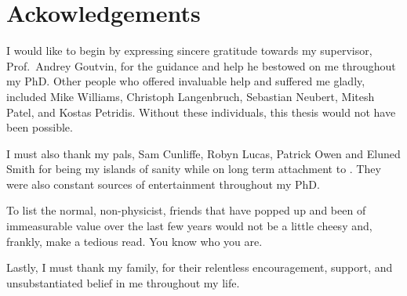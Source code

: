 \clearpage
\chapter*{\centering Ackowledgements}
\begin{center}
  {\setlength{\currentparskip}{\parskip}%
  \begin{minipage}{\abstractpagewidth}
    \setlength{\parskip}{\currentparskip}%
    I would like to begin by expressing sincere gratitude towards my supervisor, Prof.~Andrey
    Goutvin, for the guidance and help he bestowed on me throughout my PhD.
    Other people who offered invaluable help and suffered me gladly, included
    Mike Williams, Christoph Langenbruch, Sebastian Neubert, Mitesh Patel, and
    Kostas Petridis.
    Without these individuals, this thesis would not have been possible.

    I must also thank my pals, Sam Cunliffe, Robyn Lucas, Patrick Owen and Eluned Smith for being
    my islands of sanity while on long
    term attachment to \cern.
    They were also constant sources of entertainment throughout my PhD.

    To list the normal, non-physicist, friends that have popped up and been of immeasurable value
    over the last few years would not be a little cheesy and, frankly, make a tedious read.
    You know who you are.

    Lastly, I must thank my family, for their relentless encouragement, support, and
    unsubstantiated belief in me throughout my life.

  \end{minipage}}
\end{center}



